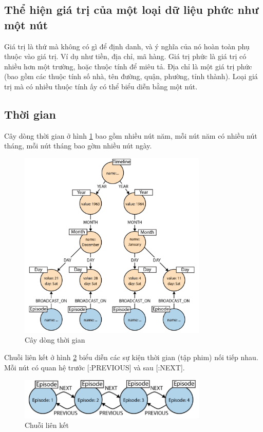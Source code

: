 \subsection{Thể hiện giá trị của một loại dữ liệu phức như một nút}
Giá trị là thứ mà không có gì để định danh, và ý nghĩa của nó hoàn toàn phụ thuộc vào giá trị. Ví dụ như tiền, địa chỉ, mã hàng. Giá trị phức là giá trị có nhiều hơn một trường, hoặc thuộc tính để miêu tả. Địa chỉ là một giá trị phức (bao gồm các thuộc tính số nhà, tên đường, quận, phường, tỉnh thành). Loại giá trị mà có nhiều thuộc tính ấy có thể biểu diễn bằng một nút. 

\subsection{Thời gian}

Cây dòng thời gian ở hình \ref{fig:timeline} bao gồm nhiều nút năm, mỗi nút năm có nhiều nút tháng, mỗi nút tháng bao gờm nhiều nút ngày. 

\begin{figure}[h]
\centering
\includegraphics[width=0.8\textwidth]{image/timeline.PNG}
\caption{\label{fig:timeline} Cây dòng thời gian }
\end{figure}

Chuỗi liên kết ở hình \ref{fig:link} biểu diễn các sự kiện thời gian (tập phim) nối tiếp nhau. Mỗi nút có quan hệ trước [:PREVIOUS] và sau [:NEXT]. 

\begin{figure}[h]
\centering
\includegraphics[width=0.8\textwidth]{image/link.PNG}
\caption{\label{fig:link} Chuỗi liên kết }
\end{figure}



